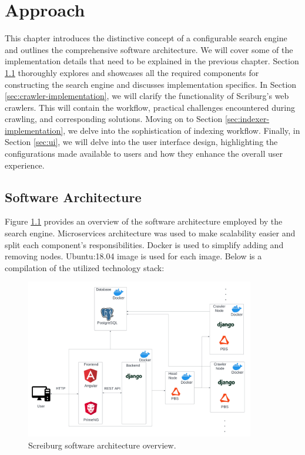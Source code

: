 \chapter{Approach}
\label{chap:approach}
This chapter introduces the distinctive concept of a configurable search engine and outlines the comprehensive software architecture. We will cover some of the implementation details that need to be explained in the previous chapter. Section \ref{sec:software-arch} thoroughly explores and showcases all the required components for constructing the search engine and discusses implementation specifics. In Section \ref{sec:crawler-implementation}, we will clarify the functionality of Scriburg's web crawlers. This will contain the workflow, practical challenges encountered during crawling, and corresponding solutions. Moving on to Section \ref{sec:indexer-implementation}, we delve into the sophistication of indexing workflow. Finally, in Section \ref{sec:ui}, we will delve into the user interface design, highlighting the configurations made available to users and how they enhance the overall user experience.

\section{Software Architecture}\label{sec:software-arch}

Figure \ref{fig:software-arch} provides an overview of the software architecture employed by the search engine. Microservices architecture was used to make scalability easier and split each component's responsibilities. Docker is used to simplify adding and removing nodes. Ubuntu:18.04 image is used for each image. Below is a compilation of the utilized technology stack:

\begin{figure}[h]	
     \centering
     \includegraphics[width=10cm]{figures/software_arch.png}
     \caption{Screiburg software architecture overview.}
     \label{fig:software-arch}
\end{figure}

